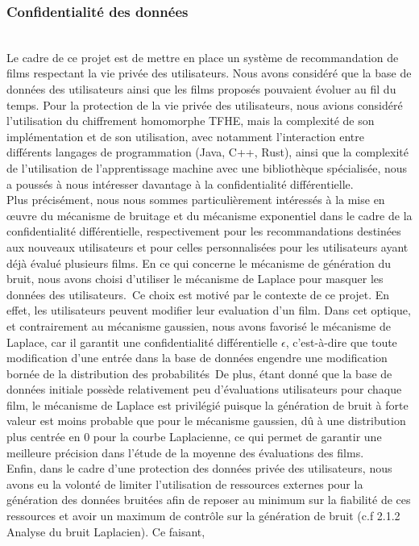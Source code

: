 \documentclass{article}
\begin{document}
\subsubsection{Confidentialité des données}
$ $\\
Le cadre de ce projet est de mettre en place un système de recommandation de films respectant la vie privée des utilisateurs. Nous avons
considéré que la base de données des utilisateurs ainsi que les films proposés pouvaient évoluer au fil du temps.
Pour la protection de la vie privée des utilisateurs, nous avions considéré l'utilisation du chiffrement homomorphe TFHE, mais
la complexité de son implémentation et de son utilisation, avec notamment l'interaction entre différents langages de programmation (Java, C++, Rust),
ainsi que la complexité de l'utilisation de l'apprentissage machine avec une bibliothèque spécialisée, nous a poussés à nous intéresser davantage à la confidentialité différentielle.\\
Plus précisément, nous nous sommes particulièrement intéressés à la mise en œuvre du mécanisme de bruitage et du mécanisme exponentiel dans le cadre de la 
confidentialité différentielle, respectivement pour les recommandations destinées aux nouveaux utilisateurs et pour celles personnalisées pour les utilisateurs 
ayant déjà évalué plusieurs films.
En ce qui concerne le mécanisme de génération du bruit, nous avons choisi d'utiliser le mécanisme de Laplace pour masquer les données des utilisateurs.\
Ce choix est motivé par le contexte de ce projet. En effet, les utilisateurs peuvent modifier leur evaluation d'un film. Dans cet optique, et contrairement au
mécanisme gaussien, nous avons favorisé le mécanisme de Laplace, car il garantit une confidentialité différentielle $\epsilon$, c’est-à-dire que toute modification 
d’une entrée dans la base de données engendre une modification bornée de la distribution des probabilités\
De plus, étant donné que la base de données initiale possède relativement peu d'évaluations utilisateurs pour chaque film, le mécanisme de Laplace est privilégié
puisque la génération de bruit à forte valeur est moins probable que pour le mécanisme gaussien, dû à une distribution plus centrée en 0 pour la courbe Laplacienne,
ce qui permet de garantir une meilleure précision dans l'étude de la moyenne des évaluations des films.\\
Enfin, dans le cadre d'une protection des données privée des utilisateurs, nous avons eu la volonté de limiter l'utilisation de ressources externes
pour la génération des données bruitées afin de reposer au minimum sur la fiabilité de ces ressources et avoir un maximum de contrôle sur la génération de bruit (c.f 2.1.2 Analyse du bruit Laplacien). Ce faisant,
\end{document}
